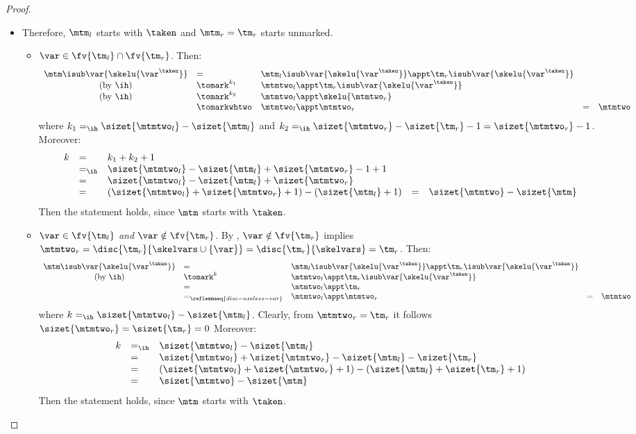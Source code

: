 \begin{proof}
\begin{itemize}
\begin{itemize}
\item {}
Therefore, $\mtm_l$ starts with $\taken$ and $\mtm_r = \tm_r$ starts unmarked. 
\begin{itemize}
\item $\var \in \fv{\tm_l} \cap \fv{\tm_r}$. Then:
\[\begin{array}{cllllll}
\mtm\isub\var{\skelu{\var^\taken}}
  &= &
  \mtm_l\isub\var{\skelu{\var^\taken}}\appt\tm_r\isub\var{\skelu{\var^\taken}} 
  \\
    \mbox{(by \ih)} &\tomark^{k_1} &
  \mtmtwo_l\appt \tm_r\isub\var{\skelu{\var^\taken}} 
  \\
    \mbox{(by \ih)} &\tomark^{k_2} &
    \mtmtwo_l\appt\skelu{\mtmtwo_r} 
    \\
  &\tomarkwhtwo &
  \mtmtwo_l\appt\mtmtwo_r
  &= &
  \mtmtwo
\end{array}\]
where $k_1 =_{\ih} \sizet{\mtmtwo_l} - \sizet{\mtm_l}$ and $k_2 =_{\ih} \sizet{\mtmtwo_r} - \sizet{\tm_r} -1 = \sizet{\mtmtwo_r}-1$.
Moreover:
\[\begin{array}{cllllll}
k & = & k_1 + k_2 +1
\\
& =_{\ih} & 
\sizet{\mtmtwo_l} - \sizet{\mtm_l} + \sizet{\mtmtwo_r} -1 +1
\\
& = & 
\sizet{\mtmtwo_l} - \sizet{\mtm_l} + \sizet{\mtmtwo_r}
\\
& = & 
(\sizet{\mtmtwo_l} + \sizet{\mtmtwo_r} +1) - (\sizet{\mtm_l} +1)
& = & 
\sizet{\mtmtwo}-\sizet{\mtm}
\end{array}\]
Then the statement holds, since $\mtm$ starts with $\taken$.

\item \emph{$\var \in \fv{\tm_l}$ and $\var\notin\fv{\tm_r}$}. By , $\var \notin \fv{\tm_r}$ implies $\mtmtwo_r=\disc{\tm_r}{\skelvars \cup \{\var\}} = \disc{\tm_r}{\skelvars} = \tm_r$. Then:
\[\begin{array}{cllllll}
\mtm\isub\var{\skelu{\var^\taken}}
  &= & 
  \mtm_l\isub\var{\skelu{\var^\taken}}\appt\tm_r\isub\var{\skelu{\var^\taken}} 
  \\
   \mbox{(by \ih)}  &\tomark^{k} &
\mtmtwo_l\appt \tm_r\isub\var{\skelu{\var^\taken}} 
  \\
 &= &
  \mtmtwo_l \appt \tm_r
  \\
 &=_{\reflemmaeq{disc-useless-var}} &
  \mtmtwo_l \appt \mtmtwo_r
  &=&
  \mtmtwo
\end{array}\]
where $k =_{\ih} \sizet{\mtmtwo_l} - \sizet{\mtm_l}$.
 Clearly, from $\mtmtwo_r= \tm_r$ it follows $\sizet{\mtmtwo_r}= \sizet{\tm_r}=0$
Moreover:
\[\begin{array}{lllllll}
k & =_{\ih} & 
\sizet{\mtmtwo_l} - \sizet{\mtm_l} 
\\
& = & 
\sizet{\mtmtwo_l} +\sizet{\mtmtwo_r} - \sizet{\mtm_l} - \sizet{\tm_r}
\\
& = & 
(\sizet{\mtmtwo_l} +\sizet{\mtmtwo_r}+1) - (\sizet{\mtm_l} + \sizet{\tm_r}+1)
\\
& = & 
\sizet{\mtmtwo} - \sizet{\mtm}
\end{array}\]
Then the statement holds, since $\mtm$ starts with $\taken$.


\end{itemize}
\end{itemize}
\end{itemize}
\end{proof}
